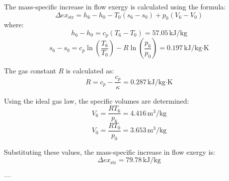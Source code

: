 The mass-specific increase in flow exergy is calculated using the formula:  
\[
\Delta ex_{\text{str}} = h_6 - h_0 - T_0 (s_6 - s_0) + p_0 (V_6 - V_0)
\]  
where:  
\[
h_6 - h_0 = c_p (T_6 - T_0) = 57.05 \, \text{kJ/kg}
\]  
\[
s_6 - s_0 = c_p \ln \left( \frac{T_6}{T_0} \right) - R \ln \left( \frac{p_6}{p_0} \right) = 0.197 \, \text{kJ/kg·K}
\]  

The gas constant \( R \) is calculated as:  
\[
R = c_p - \frac{c_p}{\kappa} = 0.287 \, \text{kJ/kg·K}
\]  

Using the ideal gas law, the specific volumes are determined:  
\[
V_6 = \frac{RT_6}{p_6} = 4.416 \, \text{m}^3/\text{kg}
\]  
\[
V_0 = \frac{RT_0}{p_0} = 3.653 \, \text{m}^3/\text{kg}
\]  

Substituting these values, the mass-specific increase in flow exergy is:  
\[
\Delta ex_{\text{str}} = 79.78 \, \text{kJ/kg}
\]  

---